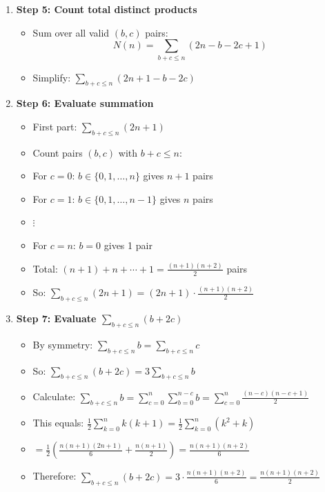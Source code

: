 \documentclass[12pt]{article}
\begin{document}
\begin{techniquesbox}
\begin{itemize}[leftmargin=*]
\begin{enumerate}
        \item \textbf{Step 5: Count total distinct products}
        \begin{itemize}
            \item Sum over all valid $(b, c)$ pairs:
            \[N(n) = \sum_{b+c \leq n} (2n - b - 2c + 1)\]
            \item Simplify: $\sum_{b+c \leq n} (2n + 1 - b - 2c)$
        \end{itemize}
        
        \item \textbf{Step 6: Evaluate summation}
        \begin{itemize}
            \item First part: $\sum_{b+c \leq n} (2n+1)$
            \item Count pairs $(b,c)$ with $b+c \leq n$:
            \item For $c=0$: $b \in \{0,1,\ldots,n\}$ gives $n+1$ pairs
            \item For $c=1$: $b \in \{0,1,\ldots,n-1\}$ gives $n$ pairs
            \item $\vdots$
            \item For $c=n$: $b = 0$ gives 1 pair
            \item Total: $(n+1) + n + \cdots + 1 = \frac{(n+1)(n+2)}{2}$ pairs
            \item So: $\sum_{b+c \leq n} (2n+1) = (2n+1) \cdot \frac{(n+1)(n+2)}{2}$
        \end{itemize}
        
        \item \textbf{Step 7: Evaluate $\sum_{b+c \leq n} (b + 2c)$}
        \begin{itemize}
            \item By symmetry: $\sum_{b+c \leq n} b = \sum_{b+c \leq n} c$
            \item So: $\sum_{b+c \leq n} (b + 2c) = 3\sum_{b+c \leq n} b$
            \item Calculate: $\sum_{b+c \leq n} b = \sum_{c=0}^n \sum_{b=0}^{n-c} b = \sum_{c=0}^n \frac{(n-c)(n-c+1)}{2}$
            \item This equals: $\frac{1}{2}\sum_{k=0}^n k(k+1) = \frac{1}{2}\sum_{k=0}^n (k^2 + k)$
            \item $= \frac{1}{2}\left(\frac{n(n+1)(2n+1)}{6} + \frac{n(n+1)}{2}\right) = \frac{n(n+1)(n+2)}{6}$
            \item Therefore: $\sum_{b+c \leq n} (b+2c) = 3 \cdot \frac{n(n+1)(n+2)}{6} = \frac{n(n+1)(n+2)}{2}$
        \end{itemize}
        

\end{enumerate}
\end{itemize}
\end{techniquesbox}
\end{document}
